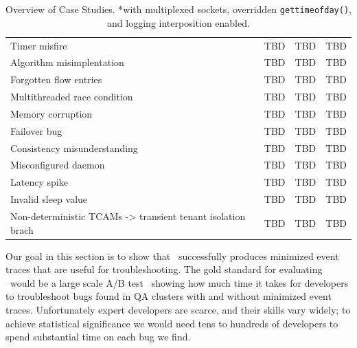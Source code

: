 \begin{table}
\begin{tabular}{l|l|l|l}
Timer misfire & TBD & TBD & TBD \\
Algorithm misimplentation & TBD & TBD & TBD \\
Forgotten flow entries & TBD & TBD & TBD \\
Multithreaded race condition & TBD & TBD & TBD \\
Memory corruption & TBD & TBD & TBD \\
Failover bug & TBD & TBD & TBD \\
Consistency misunderstanding & TBD & TBD & TBD \\
Misconfigured daemon & TBD & TBD & TBD \\
Latency spike & TBD & TBD & TBD \\
Invalid sleep value & TBD & TBD & TBD \\
Non-deterministic TCAMs -> transient tenant isolation brach & TBD & TBD & TBD \\
\end{tabular}
\caption{Overview of Case Studies. \newline
\textmd{*with multiplexed sockets, overridden {\tt gettimeofday()}, and
logging interposition enabled.}}
\label{tab:case_studies}
\end{table}

Our goal in this section is to show that \simulator~successfully produces
minimized event traces that are useful for troubleshooting.
The gold standard for evaluating \simulator~would be a large scale A/B test~\cite{neyman}
showing how much time it takes for developers to troubleshoot bugs found in
QA clusters with and without minimized event traces. Unfortunately
expert developers are scarce, and their skills vary widely; to achieve statistical significance we would
need tens to hundreds of developers to spend substantial time on each bug we find.

